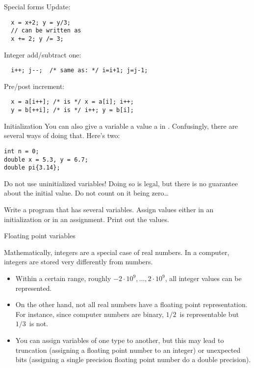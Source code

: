 \begin{block}{Special forms}
  \label{sl:special-assign}
  Update:
\begin{verbatim}
  x = x+2; y = y/3;
  // can be written as
  x += 2; y /= 3;
\end{verbatim}
Integer add/subtract one:
\begin{verbatim}
  i++; j--;  /* same as: */ i=i+1; j=j-1;
\end{verbatim}
  Pre/post increment:
\begin{verbatim}
  x = a[i++]; /* is */ x = a[i]; i++;
  y = b[++i]; /* is */ i++; y = b[i];
\end{verbatim}
\end{block}

\begin{block}{Initialization}
  \label{sl:init-var}
  You can also give a variable a value a in
  . Confusingly, there are
  several ways of doing that. Here's two:
\begin{verbatim}
int n = 0;
double x = 5.3, y = 6.7;
double pi{3.14};
\end{verbatim}
  Do not use uninitialized variables! Doing so is legal, but there is
  no guarantee about the initial value. Do not count on it being zero\ldots
\end{block}

\begin{exercise}
  \label{ex:print-variables}
  Write a program that has several variables. Assign values either in
  an initialization or in an assignment. Print out the values.
\end{exercise}

 {Floating point variables}

Mathematically, integers are a special case of real numbers.
In a computer, integers are stored very differently from
 numbers.
\begin{itemize}
\item Within a certain range, roughly
  $-2\cdot 10^9,\ldots,2\cdot 10^9$,
  all integer values can be represented.
\item On the other hand, not all real numbers have a floating point
  representation. For instance, since computer numbers are binary,
  $1/2$~is representable but $1/3$~is not.
\item You can assign variables of one type to another, but this may
  lead to truncation (assigning a floating point number to an integer)
  or unexpected bits (assigning a single precision floating point
  number do a double precision).
\end{itemize}


